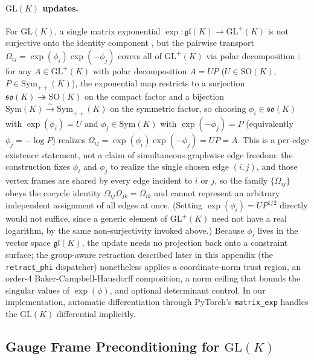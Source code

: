 \documentclass[twoside,11pt]{article}
\begin{document}
\paragraph{$\mathrm{GL}(K)$ updates.} For $\mathrm{GL}(K)$, a single matrix exponential $\exp: \mathfrak{gl}(K) \to \mathrm{GL}^+(K)$ is not surjective onto the identity component \citep{culver1966existence}, but the pairwise transport $\Omega_{ij} = \exp(\phi_i)\exp(-\phi_j)$ covers all of $\mathrm{GL}^+(K)$ via polar decomposition \citep[\S8]{Higham2008}: for any $A \in \mathrm{GL}^+(K)$ with polar decomposition $A = UP$ ($U \in \mathrm{SO}(K)$, $P \in \mathrm{Sym}_{++}(K)$), the exponential map restricts to a surjection $\mathfrak{so}(K) \twoheadrightarrow \mathrm{SO}(K)$ on the compact factor and a bijection $\mathrm{Sym}(K) \xrightarrow{\sim} \mathrm{Sym}_{++}(K)$ on the symmetric factor, so choosing $\phi_i \in \mathfrak{so}(K)$ with $\exp(\phi_i) = U$ and $\phi_j \in \mathrm{Sym}(K)$ with $\exp(-\phi_j) = P$ (equivalently $\phi_j = -\log P$) realizes $\Omega_{ij} = \exp(\phi_i)\exp(-\phi_j) = UP = A$. This is a per-edge existence statement, not a claim of simultaneous graphwise edge freedom: the construction fixes $\phi_i$ and $\phi_j$ to realize the single chosen edge $(i,j)$, and those vertex frames are shared by every edge incident to $i$ or $j$, so the family $\{\Omega_{ij}\}$ obeys the cocycle identity $\Omega_{ij}\Omega_{jk} = \Omega_{ik}$ and cannot represent an arbitrary independent assignment of all edges at once. (Setting $\exp(\phi_i) = UP^{1/2}$ directly would not suffice, since a generic element of $\mathrm{GL}^+(K)$ need not have a real logarithm, by the same non-surjectivity invoked above.) Because $\phi_i$ lives in the vector space $\mathfrak{gl}(K)$, the update needs no projection back onto a constraint surface; the group-aware retraction described later in this appendix (the \texttt{retract\_phi} dispatcher) nonetheless applies a coordinate-norm trust region, an order-4 Baker-Campbell-Hausdorff composition, a norm ceiling that bounds the singular values of $\exp(\phi)$, and optional determinant control. In our implementation, automatic differentiation through PyTorch's \texttt{matrix\_exp} handles the $\mathrm{GL}(K)$ differential implicitly.

\subsection{Gauge Frame Preconditioning for $\mathrm{GL}(K)$}
\label{sec:glk_preconditioning}
\end{document}

